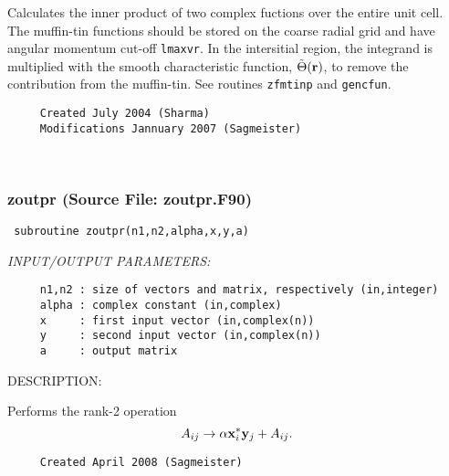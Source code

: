 \documentclass[11pt]{article}
\begin{document}
     Calculates the inner product of two complex fuctions over the entire unit
     cell. The muffin-tin functions should be stored on the coarse radial grid
     and have angular momentum cut-off {\tt lmaxvr}. In the intersitial region,
     the integrand is multiplied with the smooth characteristic function,
     $\tilde{\Theta}({\bf r})$, to remove the contribution from the muffin-tin.
     See routines {\tt zfmtinp} and {\tt gencfun}.
  
\begin{verbatim}     Created July 2004 (Sharma)
     Modifications Jannuary 2007 (Sagmeister)\end{verbatim}


 
 
\mbox{}\hrulefill\ 
 
\subsubsection{zoutpr (Source File: zoutpr.F90)}


\begin{verbatim} subroutine zoutpr(n1,n2,alpha,x,y,a)\end{verbatim}{\em INPUT/OUTPUT PARAMETERS:}
\begin{verbatim}     n1,n2 : size of vectors and matrix, respectively (in,integer)
     alpha : complex constant (in,complex)
     x     : first input vector (in,complex(n))
     y     : second input vector (in,complex(n))
     a     : output matrix\end{verbatim}
{\sf DESCRIPTION:\\ }


     Performs the rank-2 operation
     $$ A_{ij}\rightarrow\alpha{\bf x}_i^*{\bf y}_j+A_{ij}. $$
  
\begin{verbatim}     Created April 2008 (Sagmeister)\end{verbatim}

\end{document}
